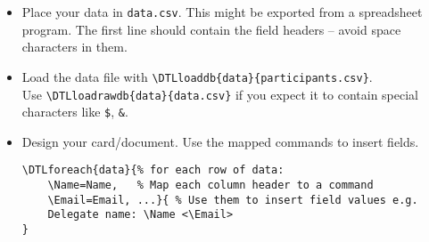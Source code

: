 \begin{itemize}[leftmargin=0pt,topsep=6pt,itemsep=0pt]
\tiny
\item Place your data in \texttt{data.csv}. This might be exported from a spreadsheet program. The first line should contain the field headers -- avoid space characters in them. 

\item Load the data file with \verb|\DTLloaddb{data}{participants.csv}|.\\Use \verb|\DTLloadrawdb{data}{data.csv}| if you expect it to contain special characters like \verb|$|, \verb|&|.

\item Design your card/document. Use the mapped commands to insert fields.
\vspace{-3pt}
\begin{lstlisting}
\DTLforeach{data}{% for each row of data:
    \Name=Name,   % Map each column header to a command
    \Email=Email, ...}{ % Use them to insert field values e.g.
    Delegate name: \Name <\Email>  
}
\end{lstlisting}
\end{itemize}

\clearpage
